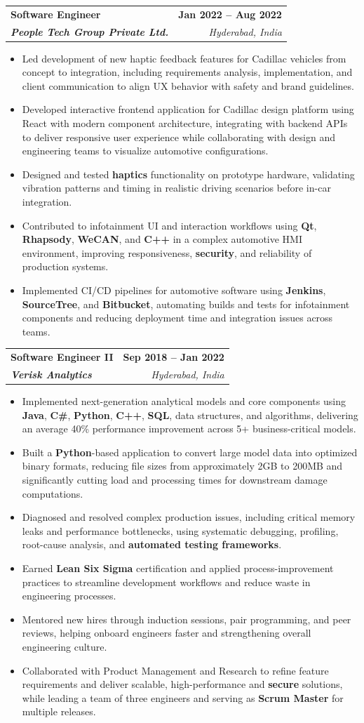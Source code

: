 \documentclass[letterpaper,11pt]{article}
\makeatletter
\newcommand{\resumeItem}[1]{
  \item\small{
    {#1 \vspace{-2pt}}
  }
}
\newcommand{\resumeSubheading}[4]{
  \vspace{-2pt}\item
    \begin{tabular*}{1.0\textwidth}[t]{l@{\extracolsep{\fill}}r}
      \textbf{#1} & \textbf{\small #2} \\
      \textit{\small#3} & \textit{\small #4} \\
    \end{tabular*}\vspace{-7pt}
}
\newcommand{\resumeItemListStart}{\begin{itemize}}
\newcommand{\resumeItemListEnd}{\end{itemize}\vspace{-5pt}}
\makeatother
\begin{document}
    \resumeSubheading
      {\textbf{Software Engineer}}{\textbf{Jan 2022 -- Aug 2022}}
      {\textbf{People Tech Group Private Ltd.}}{Hyderabad, India}
      \resumeItemListStart
        \resumeItem{Led development of new haptic feedback features for Cadillac vehicles from concept to integration, including requirements analysis, implementation, and client communication to align UX behavior with safety and brand guidelines.}
        \resumeItem{Developed interactive frontend application for Cadillac design platform using React with modern component architecture, integrating with backend APIs to deliver responsive user experience while collaborating with design and engineering teams to visualize automotive configurations.}
        \resumeItem{Designed and tested \textbf{haptics} functionality on prototype hardware, validating vibration patterns and timing in realistic driving scenarios before in-car integration.}
        \resumeItem{Contributed to infotainment UI and interaction workflows using \textbf{Qt}, \textbf{Rhapsody}, \textbf{WeCAN}, and \textbf{C++} in a complex automotive HMI environment, improving responsiveness, \textbf{security}, and reliability of production systems.}
        \resumeItem{Implemented CI/CD pipelines for automotive software using \textbf{Jenkins}, \textbf{SourceTree}, and \textbf{Bitbucket}, automating builds and tests for infotainment components and reducing deployment time and integration issues across teams.}
      \resumeItemListEnd

    \resumeSubheading
      {\textbf{Software Engineer II}}{\textbf{Sep 2018 -- Jan 2022}}
      {\textbf{Verisk Analytics}}{Hyderabad, India}
      \resumeItemListStart
        \resumeItem{Implemented next-generation analytical models and core components using \textbf{Java}, \textbf{C\#}, \textbf{Python}, \textbf{C++}, \textbf{SQL}, data structures, and algorithms, delivering an average 40\% performance improvement across 5+ business-critical models.}
        \resumeItem{Built a \textbf{Python}-based application to convert large model data into optimized binary formats, reducing file sizes from approximately 2GB to 200MB and significantly cutting load and processing times for downstream damage computations.}
        \resumeItem{Diagnosed and resolved complex production issues, including critical memory leaks and performance bottlenecks, using systematic debugging, profiling, root-cause analysis, and \textbf{automated testing frameworks}.}
        \resumeItem{Earned \textbf{Lean Six Sigma} certification and applied process-improvement practices to streamline development workflows and reduce waste in engineering processes.}
        \resumeItem{Mentored new hires through induction sessions, pair programming, and peer reviews, helping onboard engineers faster and strengthening overall engineering culture.}
        \resumeItem{Collaborated with Product Management and Research to refine feature requirements and deliver scalable, high-performance and \textbf{secure} solutions, while leading a team of three engineers and serving as \textbf{Scrum Master} for multiple releases.}
      \resumeItemListEnd
\end{document}
